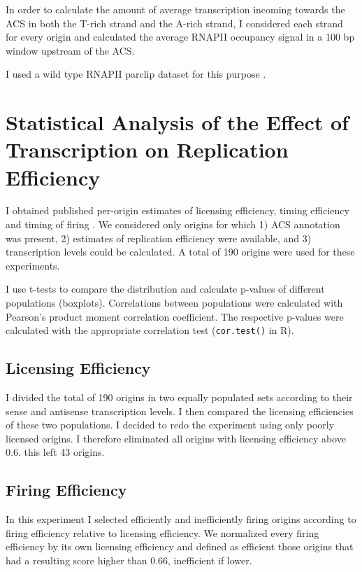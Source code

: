 In order to calculate the amount of average transcription incoming towards the ACS in both the T-rich strand and the A-rich strand, I considered each strand for every origin and calculated the average RNAPII occupancy signal in a 100 bp window upstream of the ACS.

I used a wild type RNAPII parclip dataset for this purpose \cite{schaughency:2014:genomewide}.

\section*{Statistical Analysis of the Effect of Transcription on Replication Efficiency}

I obtained published per-origin estimates of licensing efficiency, timing efficiency and timing of firing \cite{hawkins:2013:highresolution}. 
We considered only origins for which 1) ACS annotation was present, 2) estimates of replication efficiency were available, and 3)  transcription levels could be calculated. 
A total of 190 origins were used for these experiments.

I use t-tests to compare the distribution and calculate p-values of different populations (boxplots). Correlations between populations were calculated with Pearson’s product moment correlation coefficient. The respective p-values were calculated with the appropriate correlation test (\texttt{cor.test()} in R).

\subsection*{Licensing Efficiency}
I divided the total of 190 origins in two equally populated sets according to their sense and antisense transcription levels. I then compared the licensing efficiencies of these two populations.
I decided to redo the experiment using only poorly licensed origins. I therefore eliminated all origins with licensing efficiency above 0.6. this left 43 origins.

\subsection*{Firing Efficiency}

In this experiment I selected efficiently and inefficiently firing origins according to firing efficiency relative to licensing efficiency. We normalized every firing efficiency by its own licensing efficiency and defined as efficient those origins that had a resulting score higher than 0.66, inefficient if lower.

